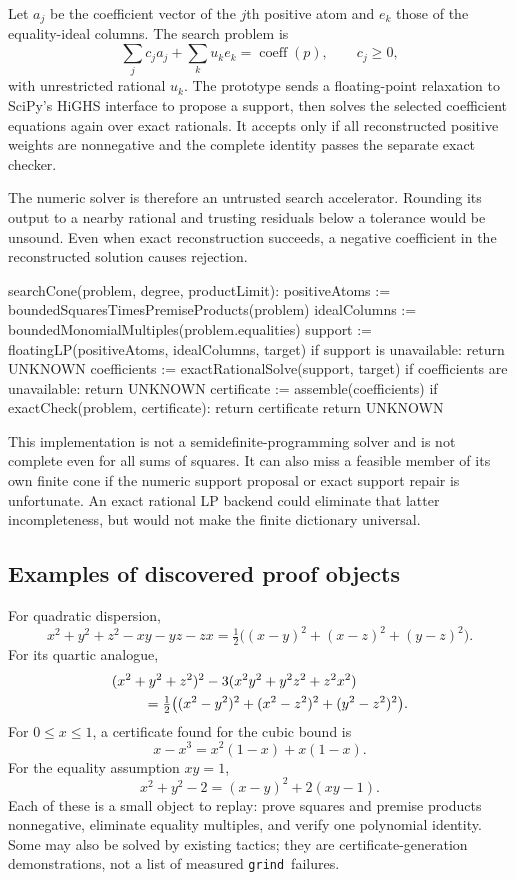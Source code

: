 \documentclass[11pt,a4paper]{article}
\newcommand{\grind}{\texttt{grind}}
\begin{document}
Let $a_j$ be the coefficient vector of the $j$th positive atom and $e_k$ those of the equality-ideal columns. The search problem is
\[
\sum_j c_ja_j+\sum_k u_ke_k=\operatorname{coeff}(p),
\qquad c_j\geq0,
\]
with unrestricted rational $u_k$. The prototype sends a floating-point relaxation to SciPy's HiGHS interface to propose a support, then solves the selected coefficient equations again over exact rationals. It accepts only if all reconstructed positive weights are nonnegative and the complete identity passes the separate exact checker.\cite{scipy}

The numeric solver is therefore an untrusted search accelerator. Rounding its output to a nearby rational and trusting residuals below a tolerance would be unsound. Even when exact reconstruction succeeds, a negative coefficient in the reconstructed solution causes rejection.

\begin{code}
searchCone(problem, degree, productLimit):
  positiveAtoms := boundedSquaresTimesPremiseProducts(problem)
  idealColumns  := boundedMonomialMultiples(problem.equalities)
  support       := floatingLP(positiveAtoms, idealColumns, target)
  if support is unavailable: return UNKNOWN
  coefficients  := exactRationalSolve(support, target)
  if coefficients are unavailable: return UNKNOWN
  certificate   := assemble(coefficients)
  if exactCheck(problem, certificate): return certificate
  return UNKNOWN
\end{code}

This implementation is not a semidefinite-programming solver and is not complete even for all sums of squares. It can also miss a feasible member of its own finite cone if the numeric support proposal or exact support repair is unfortunate. An exact rational LP backend could eliminate that latter incompleteness, but would not make the finite dictionary universal.

\subsection{Examples of discovered proof objects}

For quadratic dispersion,
\[
x^2+y^2+z^2-xy-yz-zx
 =\tfrac12\bigl((x-y)^2+(x-z)^2+(y-z)^2\bigr).
\]
For its quartic analogue,
\begin{align*}
 &(x^2+y^2+z^2)^2-3(x^2y^2+y^2z^2+z^2x^2)\\
 &\hspace{8mm}=\tfrac12\bigl((x^2-y^2)^2+(x^2-z^2)^2+(y^2-z^2)^2\bigr).
\end{align*}
For $0\leq x\leq1$, a certificate found for the cubic bound is
\[
x-x^3=x^2(1-x)+x(1-x).
\]
For the equality assumption $xy=1$,
\[
x^2+y^2-2=(x-y)^2+2(xy-1).
\]
Each of these is a small object to replay: prove squares and premise products nonnegative, eliminate equality multiples, and verify one polynomial identity. Some may also be solved by existing tactics; they are certificate-generation demonstrations, not a list of measured \grind\ failures.
\end{document}
